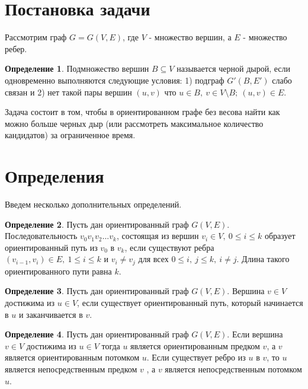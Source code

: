 \documentclass[12pt,a4paper,oneside]{article}
\theoremstyle{definition}
\newtheorem{definition}{Определение}[]
\theoremstyle{lemma}
\theoremstyle{remark}
\begin{document}
\cleardoublepage
\section{Постановка задачи}\label{sec:taskstatement}

Рассмотрим граф $G = G(V,E)$, где $V$ - множество вершин, а $E$ - множество ребер.

\begin{definition}\label{def:blackhole}
Подмножество вершин $B \subseteq V$ называется черной дырой, если одновременно выполняются следующие условия: 1) подграф $G'(B,E')$ слабо связан и 2) нет такой пары вершин $(u,v)$ что $u \in B,\ v \in V\setminus{B};\ (u,v) \in E$.
\end{definition}

Задача состоит в том, чтобы в ориентированном графе без весова найти как можно больше черных дыр (или рассмотреть максимальное количество кандидатов) за ограниченное время.

\cleardoublepage
\section{Определения}\label{sec:definitions}

Введем несколько дополнительных определений.

\begin{definition}\label{def:orpath}
Пусть дан ориентированный граф $G(V,E)$. Последовательность $v_0v_1v_2...v_k$, состоящая из вершин $v_i \in V,\ 0 \leq i \leq k$ образует ориентированный путь из $v_0$ в $v_k$, если существуют ребра $(v_{i-1}, v_i) \in E,\ 1 \leq i \leq k$ и $v_i \neq v_j$ для всех $0 \leq i,\ j \leq k,\ i \neq j$. Длина такого ориентированного пути равна $k$.
\end{definition}

\begin{definition}\label{def:reachablevertex}
Пусть дан ориентированный граф $G(V,E)$. Вершина $v \in V$ достижима из $u \in V$, если существует ориентированный путь, который начинается в $u$ и заканчивается в $v$.
\end{definition}

\begin{definition}\label{def:successor}
Пусть дан ориентированный граф $G(V,E)$. Если вершина $v \in V$ достижима из $u \in V$ тогда $u$ является ориентированным предком $v$, а $v$ является ориентированным потомком $u$. Если существует ребро из $u$ в $v$, то $u$ является непосредственным предком $v$ , а $v$ является непосредственным потомком $u$.
\end{definition}
\end{document}
